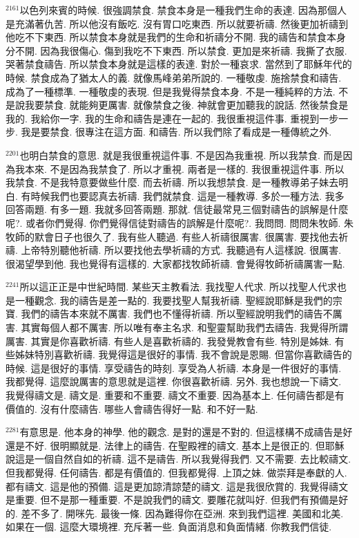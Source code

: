 \documentclass{book}
\begin{document}
$^{2161}$以色列來賓的時候.
很強調禁食.
禁食本身是一種我們生命的表達.
因為那個人是充滿著仇苦.
所以他沒有飯吃.
沒有胃口吃東西.
所以就要祈禱.
然後更加祈禱到他吃不下東西.
所以禁食本身就是我們的生命和祈禱分不開.
我的禱告和禁食本身分不開.
因為我很傷心.
傷到我吃不下東西.
所以禁食.
更加是來祈禱.
我撕了衣服.
哭著禁食禱告.
所以禁食本身就是這樣的表達.
對於一種哀求.
當然到了耶穌年代的時候.
禁食成為了猶太人的義.
就像馬峰弟弟所說的.
一種敬虔.
施捨禁食和禱告.
成為了一種標準.
一種敬虔的表現.
但是我覺得禁食本身.
不是一種純粹的方法.
不是說我要禁食.
就能夠更厲害.
就像禁食之後.
神就會更加聽我的說話.
然後禁食是我的.
我給你一字.
我的生命和禱告是連在一起的.
我很重視這件事.
重視到一步一步.
我是要禁食.
很專注在這方面.
和禱告.
所以我們除了看成是一種傳統之外.

$^{2201}$也明白禁食的意思.
就是我很重視這件事.
不是因為我重視.
所以我禁食.
而是因為我本來.
不是因為我禁食了.
所以才重視.
兩者是一樣的.
我很重視這件事.
所以我禁食.
不是我特意要做些什麼.
而去祈禱.
所以我想禁食.
是一種教導弟子妹去明白.
有時候我們也要認真去祈禱.
我們就禁食.
這是一種教導.
多於一種方法.
我多回答兩題.
有多一題.
我就多回答兩題.
那就.
信徒最常見三個對禱告的誤解是什麼呢?.
或者你們覺得.
你們覺得信徒對禱告的誤解是什麼呢?.
我問問.
問問朱牧師.
朱牧師的默會日子也很久了.
我有些人聽過.
有些人祈禱很厲害.
很厲害.
要找他去祈禱.
上帝特別聽他祈禱.
所以要找他去學祈禱的方式.
我聽過有人這樣說.
很厲害.
很渴望學到他.
我也覺得有這樣的.
大家都找牧師祈禱.
會覺得牧師祈禱厲害一點.

$^{2241}$所以這正正是中世紀時間.
某些天主教看法.
我找聖人代求.
所以找聖人代求也是一種觀念.
我的禱告是差一點的.
我要找聖人幫我祈禱.
聖經說耶穌是我們的宗寶.
我們的禱告本來就不厲害.
我們也不懂得祈禱.
所以聖經說明我們的禱告不厲害.
其實每個人都不厲害.
所以唯有奉主名求.
和聖靈幫助我們去禱告.
我覺得所謂厲害.
其實是你喜歡祈禱.
有些人是喜歡祈禱的.
我發覺教會有些.
特別是姊妹.
有些姊妹特別喜歡祈禱.
我覺得這是很好的事情.
我不會說是恩賜.
但當你喜歡禱告的時候.
這是很好的事情.
享受禱告的時刻.
享受為人祈禱.
本身是一件很好的事情.
我都覺得.
這麼說厲害的意思就是這裡.
你很喜歡祈禱.
另外.
我也想說一下禱文.
我覺得禱文是.
禱文是.
重要和不重要.
禱文不重要.
因為基本上.
任何禱告都是有價值的.
沒有什麼禱告.
哪些人會禱告得好一點.
和不好一點.

$^{2281}$有意思是.
他本身的神學.
他的觀念.
是對的還是不對的.
但這樣構不成禱告是好還是不好.
很明顯就是.
法律上的禱告.
在聖殿裡的禱文.
基本上是很正的.
但耶穌說這是一個自然自如的祈禱.
這不是禱告.
所以我覺得我們.
又不需要.
去比較禱文.
但我都覺得.
任何禱告.
都是有價值的.
但我都覺得.
上頂之妹.
做崇拜是奉獻的人.
都有禱文.
這是他的預備.
這是更加諒清諒楚的禱文.
這是我很欣賞的.
我覺得禱文是重要.
但不是那一種重要.
不是說我們的禱文.
要雕花就叫好.
但我們有預備是好的.
差不多了.
開咪先.
最後一條.
因為難得你在亞洲.
來到我們這裡.
美國和北美.
如果在一個.
這麼大環境裡.
充斥著一些.
負面消息和負面情緒.
你教我們信徒.
\end{document}
